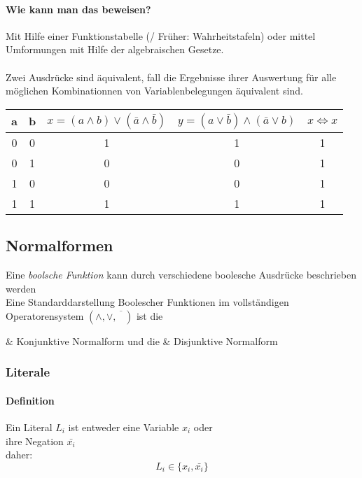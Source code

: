 \documentclass[a4paper]{scrartcl}
\begin{document}
					\paragraph{Wie kann man das beweisen?}
					Mit Hilfe einer Funktionstabelle (/ Früher: Wahrheitstafeln) oder mittel Umformungen mit Hilfe der algebraischen Gesetze.\\
					\\
					Zwei Ausdrücke sind äquivalent, fall die Ergebnisse ihrer Auswertung für alle möglichen Kombinationnen von Variablenbelegungen äquivalent sind. 
					\begin{table}[H]
						\centering
						\begin{tabular}{|c c|c|c|c|}
							\hline
							a&b&\( x = (a \wedge b) \vee (\bar{a} \wedge \bar{b}) \)& \(y = ( a \vee \bar{b} ) \wedge (\bar{a} \vee b ) \)& \( x \iff x\)\\ \hline 
							0&0&1&1&1\\
							0&1&0&0&1\\
							1&0&0&0&1\\
							1&1&1&1&1\\ \hline
						\end{tabular}
					\end{table}
			
			\subsection{Normalformen}
			Eine \emph{boolsche Funktion} kann durch verschiedene boolesche Ausdrücke beschrieben werden\\
			Eine Standarddarstellung Boolescher Funktionen im vollständigen Operatorensystem \(( \wedge, \vee, \overline{\phantom{A}}  )\) ist die 
				\begin{easylist}
					& Konjunktive Normalform und die 
					& Disjunktive Normalform
				\end{easylist}
			
			\subsubsection{Literale}
			\paragraph{Definition}
			Ein Literal \( L_i \) ist entweder eine Variable \( x_i \) oder\\
			ihre Negation \( \bar{x_i} \)\\
			daher: \[ L_i \in \{ x_i, \bar{x_i} \} \]
			
\end{document}
